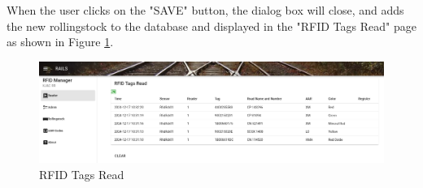 When the user clicks on the "SAVE" button, the dialog box will close, and adds the new rollingstock to the database
and displayed in the "RFID Tags Read" page as shown in Figure \ref{fig:reader6}.
\begin{figure}[H]
    \centering
    \includegraphics[scale=0.33]{./images/reader5.png}
    \caption{RFID Tags Read}
    \label{fig:reader6}
\end{figure}

